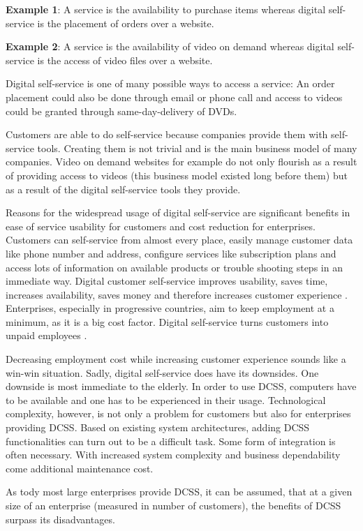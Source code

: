 \documentclass[
     12pt,         %
     a4paper,      %
     BCOR10mm,     %
     DIV14,        %
aragraph skip instad of paragraph indent
     ]{scrreprt}
\begin{document}
\textbf{Example 1}: A service is the availability to purchase items whereas digital self-service is the placement of orders over a website.

\textbf{Example 2}: A service is the availability of video on demand whereas digital self-service is the access of video files over a website.

Digital self-service is one of many possible ways to access a service: An order placement could also be done through email
or phone call and access to videos could be granted through same-day-delivery of DVDs.

Customers are able to do self-service because companies provide them with self-service tools. Creating them is not trivial
and is the main business model of many companies. Video on demand websites for example do not only flourish as a result of providing access to
videos (this business model existed long before them) but as a result of the digital self-service tools they provide.

Reasons for the widespread usage of digital self-service are significant benefits in ease of service usability for customers and cost reduction for enterprises.
Customers can self-service from almost every place, easily manage customer data like phone number and address, configure services like subscription plans and
access lots of information on available products or trouble shooting steps in an immediate way.
Digital customer self-service improves usability, saves time, increases availability, saves money and therefore increases customer experience
\cite[cf. 243]{CSSInternetAge}.
Enterprises, especially in progressive countries, aim to keep employment at a minimum, as it is a big cost factor. Digital self-service turns customers into
unpaid employees \cite{served}.

Decreasing employment cost while increasing customer experience sounds like a win-win situation. Sadly, digital self-service does have its downsides.
One downside is most immediate to the elderly. In order to use DCSS, computers have to be available and one has to be experienced in their usage.
Technological complexity, however, is not only a problem for customers but also for enterprises providing DCSS. Based on existing system architectures,
adding DCSS functionalities can turn out to be a difficult task. Some form of integration is often necessary. With increased system complexity and business
dependability come additional maintenance cost.

As tody most large enterprises provide DCSS, it can be assumed, that at a given size of an enterprise (measured in number of customers), the benefits of DCSS
surpass its disadvantages.
\end{document}

